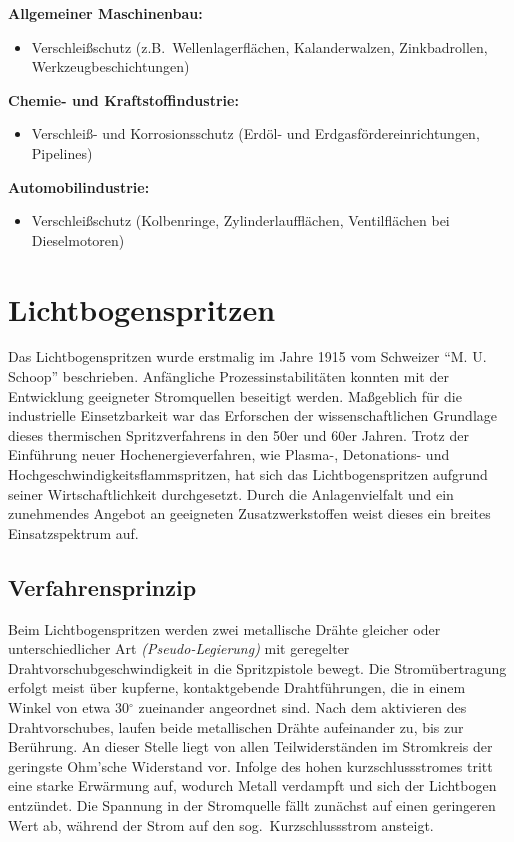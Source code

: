 \documentclass[12pt,a4paper,bibliography=totocnumbered,listof=totocnumbered,fleqn]{scrartcl}
\begin{document}
\textbf{Allgemeiner Maschinenbau:}
\begin{itemize}
	\item Verschleißschutz (z.B.\ Wellenlagerflächen, Kalanderwalzen, Zinkbadrollen, Werkzeugbeschichtungen)
\end{itemize}

\textbf{Chemie- und Kraftstoffindustrie:}
\begin{itemize}
	\item Verschleiß- und Korrosionsschutz (Erdöl- und Erdgasfördereinrichtungen, Pipelines)
\end{itemize}

\textbf{Automobilindustrie:}
\begin{itemize}
	\item Verschleißschutz (Kolbenringe, Zylinderlaufflächen, Ventilflächen bei Dieselmotoren)
\end{itemize}

\pagebreak
\section{Lichtbogenspritzen}

Das Lichtbogenspritzen wurde erstmalig im Jahre 1915 vom Schweizer \enquote{M. U. Schoop} beschrieben. Anfängliche Prozessinstabilitäten konnten mit der Entwicklung geeigneter Stromquellen beseitigt werden. Maßgeblich für die industrielle Einsetzbarkeit war das Erforschen der wissenschaftlichen Grundlage dieses thermischen Spritzverfahrens in den 50er und 60er Jahren. Trotz der Einführung neuer Hochenergieverfahren, wie Plasma-, Detonations- und Hochgeschwindigkeitsflammspritzen, hat sich das Lichtbogenspritzen aufgrund seiner Wirtschaftlichkeit durchgesetzt. Durch die Anlagenvielfalt und ein zunehmendes Angebot an geeigneten Zusatzwerkstoffen weist dieses ein breites Einsatzspektrum auf. 

\subsection{Verfahrensprinzip}

Beim Lichtbogenspritzen werden zwei metallische Drähte gleicher oder unterschiedlicher Art \emph{(Pseudo-Legierung)} mit geregelter Drahtvorschubgeschwindigkeit in die Spritzpistole bewegt. Die Stromübertragung erfolgt meist über kupferne, kontaktgebende Drahtführungen, die in einem Winkel von etwa 30$^\circ$ zueinander angeordnet sind. Nach dem aktivieren des Drahtvorschubes, laufen beide metallischen Drähte aufeinander zu, bis zur Berührung. An dieser Stelle liegt von allen Teilwiderständen im Stromkreis der geringste Ohm'sche Widerstand vor. Infolge des hohen kurzschlussstromes tritt eine starke Erwärmung auf, wodurch Metall verdampft und sich der Lichtbogen entzündet. Die Spannung in der Stromquelle fällt zunächst auf einen geringeren Wert ab, während der Strom auf den sog.\ Kurzschlussstrom ansteigt.
\end{document}
